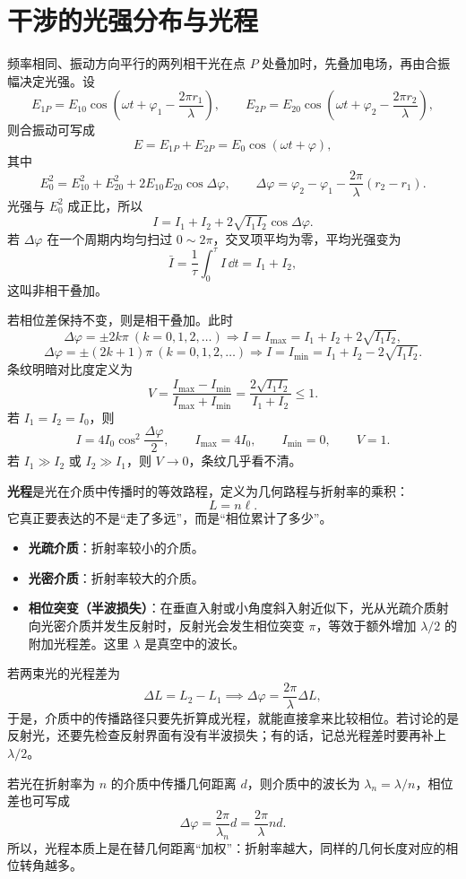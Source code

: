 
\section{干涉的光强分布与光程}

\begin{definition}[干涉的光强分布]
频率相同、振动方向平行的两列相干光在点 \(P\) 处叠加时，先叠加电场，再由合振幅决定光强。设
\[
E_{1P}=E_{10}\cos\!\left(\omega t+\varphi_1-\frac{2\pi r_1}{\lambda}\right),\qquad
E_{2P}=E_{20}\cos\!\left(\omega t+\varphi_2-\frac{2\pi r_2}{\lambda}\right),
\]
则合振动可写成
\[
E=E_{1P}+E_{2P}=E_0\cos(\omega t+\varphi),
\]
其中
\[
E_0^2=E_{10}^2+E_{20}^2+2E_{10}E_{20}\cos\Delta\varphi,\qquad
\Delta\varphi=\varphi_2-\varphi_1-\frac{2\pi}{\lambda}(r_2-r_1).
\]
光强与 \(E_0^2\) 成正比，所以
\[
I=I_1+I_2+2\sqrt{I_1I_2}\cos\Delta\varphi.
\]
若 \(\Delta\varphi\) 在一个周期内均匀扫过 \(0\sim2\pi\)，交叉项平均为零，平均光强变为
\[
\bar I=\frac{1}{\tau}\int_0^\tau I\,\dd t=I_1+I_2,
\]
这叫非相干叠加。

若相位差保持不变，则是相干叠加。此时
\[
\Delta\varphi=\pm 2k\pi\ (k=0,1,2,\dots)\Rightarrow I=I_{\max}=I_1+I_2+2\sqrt{I_1I_2},
\]
\[
\Delta\varphi=\pm(2k+1)\pi\ (k=0,1,2,\dots)\Rightarrow I=I_{\min}=I_1+I_2-2\sqrt{I_1I_2}.
\]
条纹明暗对比度定义为
\[
V=\frac{I_{\max}-I_{\min}}{I_{\max}+I_{\min}}
=\frac{2\sqrt{I_1I_2}}{I_1+I_2}\le1.
\]
若 \(I_1=I_2=I_0\)，则
\[
I=4I_0\cos^2\frac{\Delta\varphi}{2},\qquad I_{\max}=4I_0,\qquad I_{\min}=0,\qquad V=1.
\]
若 \(I_1\gg I_2\) 或 \(I_2\gg I_1\)，则 \(V\to0\)，条纹几乎看不清。
\end{definition}

\begin{definition}[光程]\label{def:optical-path}
\textbf{光程}是光在介质中传播时的等效路程，定义为几何路程与折射率的乘积：
\[
L=n\ell.
\]
它真正要表达的不是“走了多远”，而是“相位累计了多少”。

\begin{itemize}
    \item \textbf{光疏介质}：折射率较小的介质。
    \item \textbf{光密介质}：折射率较大的介质。
    \item \textbf{相位突变（半波损失）}：在垂直入射或小角度斜入射近似下，光从光疏介质射向光密介质并发生反射时，反射光会发生相位突变 \(\pi\)，等效于额外增加 \(\lambda/2\) 的附加光程差。这里 \(\lambda\) 是真空中的波长。
\end{itemize}

若两束光的光程差为
\[
\Delta L=L_2-L_1\implies
\Delta\varphi=\frac{2\pi}{\lambda}\Delta L,
\]
于是，介质中的传播路径只要先折算成光程，就能直接拿来比较相位。若讨论的是反射光，还要先检查反射界面有没有半波损失；有的话，记总光程差时要再补上 \(\lambda/2\)。

若光在折射率为 \(n\) 的介质中传播几何距离 \(d\)，则介质中的波长为 \(\lambda_n=\lambda/n\)，相位差也可写成
\[
\Delta\varphi=\frac{2\pi}{\lambda_n}d=\frac{2\pi}{\lambda}nd.
\]
所以，光程本质上是在替几何距离“加权”：折射率越大，同样的几何长度对应的相位转角越多。
\end{definition}

